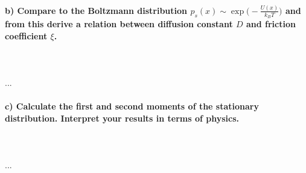 \newpage
\paragraph{b) Compare to the Boltzmann distribution 
    $p_s(x)\sim\exp\bigg(-\frac{U(x)}{k_BT}\bigg)$ and from this derive a 
    relation between diffusion constant $D$ and friction coefficient $\xi$.
} \ \\
\\
    ...

\paragraph{c) Calculate the first and second moments of the stationary
    distribution. Interpret your results in terms of physics.
} \ \\
\\
    ...

